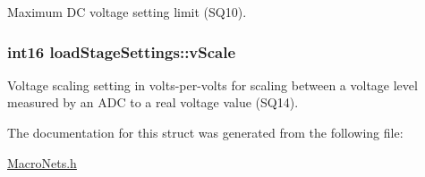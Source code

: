 Maximum D\-C voltage setting limit (S\-Q10). \hypertarget{a00008_ad0a53855bdd49163d6556bcef037b7e0}{
\subsubsection[{v\-Scale}]{\setlength{\rightskip}{0pt plus 5cm}int16 load\-Stage\-Settings\-::v\-Scale}}\label{a00008_ad0a53855bdd49163d6556bcef037b7e0}
Voltage scaling setting in volts-\/per-\/volts for scaling between a voltage level measured by an A\-D\-C to a real voltage value (S\-Q14). 

The documentation for this struct was generated from the following file\-:\begin{DoxyCompactItemize}
\item 
\hyperlink{a00027}{Macro\-Nets.\-h}\end{DoxyCompactItemize}
